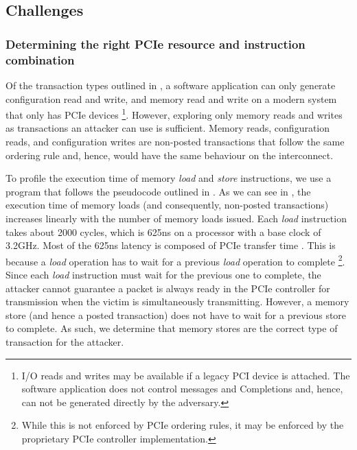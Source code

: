 \subsection{Challenges}
\label{subsec:interconnect-sc-store-ops-challenges}


\subsubsection{Determining the right PCIe resource and instruction combination}

Of the transaction types outlined in , a software application can only generate configuration read and write, and memory read and write on a modern system that only has PCIe devices
\footnote{I/O reads and writes may be available if a legacy PCI device is attached.
The software application does not control messages and Completions and, hence, can not be generated directly by the adversary.}.
However, exploring only memory reads and writes as transactions an attacker can use is sufficient. 
Memory reads, configuration reads, and configuration writes are non-posted transactions that follow the same ordering rule and, hence, would have the same behaviour on the interconnect.

To profile the execution time of memory \textit{load} and \textit{store} instructions, we use a program that follows the pseudocode outlined in .
As we can see in , the execution time of memory loads (and consequently, non-posted transactions) increases linearly with the number of memory loads issued.
Each \textit{load} instruction takes about 2000 cycles, which is 625ns on a processor with a base clock of 3.2GHz.
Most of the 625ns latency is composed of PCIe transfer time \cite{neugebauer2018understanding}.
This is because a \textit{load} operation has to wait for a previous \textit{load} operation to complete 
\footnote{While this is not enforced by PCIe ordering rules, it may be enforced by the proprietary PCIe controller implementation.}.
Since each \textit{load} instruction must wait for the previous one to complete, the attacker cannot guarantee a packet is always ready in the PCIe controller for transmission when the victim is simultaneously transmitting.
However, a memory store (and hence a posted transaction) does not have to wait for a previous store to complete.
As such, we determine that memory stores are the correct type of transaction for the attacker.

